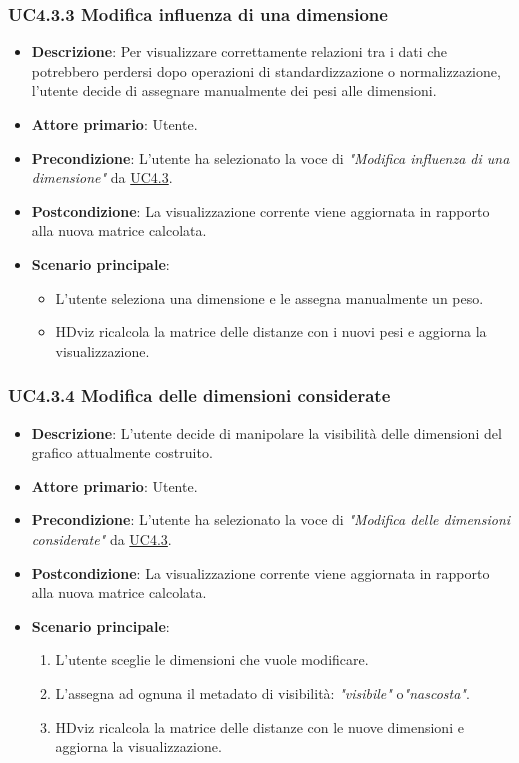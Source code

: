 \subsubsection{UC4.3.3 Modifica influenza di una dimensione}
\label{ssub:uc4.3.3}
\begin{itemize}
    \item \textbf{Descrizione}: Per visualizzare correttamente relazioni tra i dati che 
                                potrebbero perdersi dopo operazioni di standardizzazione o normalizzazione,
                                l’utente decide di assegnare manualmente dei pesi alle dimensioni.

    \item \textbf{Attore primario}: Utente.
    \item \textbf{Precondizione}: L'utente ha selezionato la voce di \emph{"Modifica influenza di una dimensione"} da \hyperref[ssub:uc4.3]{UC4.3}.

    \item \textbf{Postcondizione}: La visualizzazione corrente viene aggiornata in rapporto alla nuova matrice calcolata.
    \item \textbf{Scenario principale}:  
    \begin{itemize}
        \item L’utente seleziona una dimensione e le assegna manualmente un peso.
        \item HDviz ricalcola la matrice delle distanze con i nuovi pesi e aggiorna la visualizzazione.
    \end{itemize}
\end{itemize}

\subsubsection{UC4.3.4 Modifica delle dimensioni considerate}
\label{ssub:uc4.3.4}
\begin{itemize}
    \item \textbf{Descrizione}: L'utente decide di manipolare la visibilità delle dimensioni 
                                del grafico attualmente costruito.
    \item \textbf{Attore primario}: Utente.
    \item \textbf{Precondizione}: L'utente ha selezionato la voce di \emph{"Modifica delle dimensioni considerate"} da \hyperref[ssub:uc4.3]{UC4.3}.
    \item \textbf{Postcondizione}: La visualizzazione corrente viene aggiornata in rapporto alla nuova matrice calcolata.
    \item \textbf{Scenario principale}:
    \begin{enumerate}
        \item L'utente sceglie le dimensioni che vuole modificare. 
        \item L'assegna ad ognuna il metadato di visibilità: \emph{"visibile"} o\emph{"nascosta"}.
        \item HDviz ricalcola la matrice delle distanze con le nuove dimensioni e aggiorna la visualizzazione.
    \end{enumerate}
\end{itemize}

